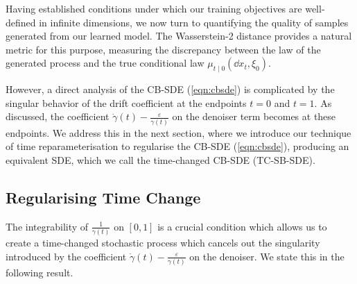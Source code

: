 Having established conditions under which our training objectives are well-defined in infinite dimensions, we now turn to quantifying the quality of samples generated from our learned model. The Wasserstein-2 distance provides a natural metric for this purpose, measuring the discrepancy between the law of the generated process and the true conditional law \(\mu_{t \mid 0}(\dd{x_{t}, \xi_{0}})\).

However, a direct analysis of the CB-SDE (\ref{eqn:cbsde}) is complicated by the singular behavior of the drift coefficient at the endpoints \(t=0\) and \(t=1\). As discussed, the coefficient \(\dot{\gamma}(t) - \frac{\varepsilon}{\gamma(t)}\) on the denoiser term becomes at these endpoints. We address this in the next section, where we introduce our technique of time reparameterisation to regularise the CB-SDE (\ref{eqn:cbsde}), producing an equivalent SDE, which we call the time-changed CB-SDE (TC-SB-SDE).

\subsection{Regularising Time Change}\label{sec:tc}
The integrability of \(\frac{1}{\gamma(t)}\) on \([0, 1]\) is a crucial condition which allows us to create a time-changed stochastic process which cancels out the singularity introduced by the coefficient \(\dot{\gamma}(t) - \frac{\varepsilon}{\gamma(t)}\) on the denoiser. We state this in the following result.

